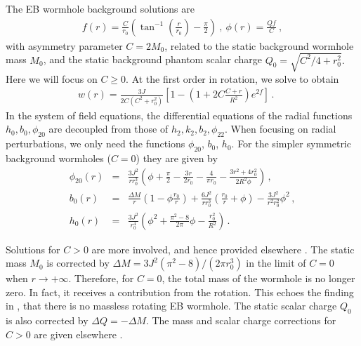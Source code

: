 \documentclass[twocolumn,showpacs,preprintnumbers,amsmath,amssymb,floatfix]{revtex4-1}
\begin{document}
The EB wormhole background solutions are
\begin{eqnarray}
    f(r) = \frac{{C}}{r_0} \left(\tan^{-1} \! \left(\frac{r}{r_0}\right)-\frac{\pi}{2}\right) \ , \ \phi(r)= \frac{Qf}{C} \ ,
\end{eqnarray}
%
%
with asymmetry parameter $C=2M_0$, related to the static background wormhole mass $M_0$, and the static background phantom scalar charge %
%
%
{$Q_{0} = \sqrt{C^2/4 + r_0^2}$.}
%
%
%
%
%
%
%
%
Here we will focus on $C\ge 0$.
At the first order in rotation, we solve to obtain
%
\begin{eqnarray}
    w(r)= \frac{3J}{2C(C^2+r_0^2)}
    \left[
    1 - \left(
    1+2C\frac{C+r}{R^2}
    \right)e^{2f}
    \right] \, . \, \, \, \, \, \, \, \,
\end{eqnarray}
In the system of field equations, the differential equations of the radial functions $h_0,{b_0},\phi_{20}$ are decoupled from those of ${h_2}, k_2, {b_2}, \phi_{22}$.
%
When focusing on radial perturbations, we only need the functions $\phi_{20}$, {$b_0$}, $h_0$.
For the simpler 
%
{symmetric}
background wormholes ($C=0$)
%
they are given by
\begin{eqnarray}
    \phi_{20}(r) &=& 
    \frac{3J^2}{rr_0^3}
    \left( 
    \phi + \frac{\pi}{2} - \frac{3r}{2r_0} - \frac{4}{\pi r_0} - \frac{3r^2+4r_0^2}{2R^2\phi}
    \right)
    \, , \nonumber \\
%
%
    b_0(r) &=& \frac{\Delta M}{r}
    \left(
    1-\phi\frac{r_0}{r}
    \right)
    +
    \frac{6J^2}{rr_0^3}
    \left(
    \frac{r_0}{r}+\phi
    \right)
    -\frac{3J^2}{r^2r_0^2}\phi^2
        \, , \nonumber \\
%
%
    h_0(r) &=&  \frac{3J^2}{r_0^4}
    \left(
    \phi^2 + \frac{\pi^2-8}{2\pi}\phi - \frac{r_0^2}{R^2}
    \right) \, .
\end{eqnarray}

%
Solutions for $C>0$ are more involved, and hence provided 
%
{elsewhere \cite{Azad:2023}}.
The static mass $M_0$ is corrected by
$\Delta M =3J^2(\pi^2-8)/(2\pi r_0^3)$
%
%
%
in the limit of $C=0$ when $r\rightarrow +\infty$.
Therefore, for %
$C=0$, the total mass of the wormhole is no longer zero. %
In fact, it receives a contribution from the rotation.
This echoes the finding in \cite{Kashargin:2008pk},
that there is no massless rotating {EB} wormhole.
%
The static scalar charge $Q_0$ is also corrected by $\Delta Q=-\Delta M$.
%
The mass {and scalar charge corrections for $C>0$ are} given
%
{elsewhere \cite{Azad:2023}}.
\end{document}
